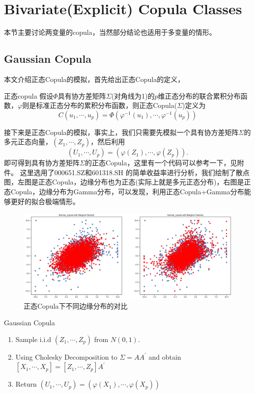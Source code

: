 \documentclass[12pt]{article}
\begin{document}






\section{Bivariate(Explicit) Copula Classes}
本节主要讨论两变量的copula，当然部分结论也适用于多变量的情形。
\subsection{Gaussian Copula}
本文介绍正态Copula的模拟，首先给出正态Copula的定义，
\begin{sdefinition}{正态copula}{}
假设$\Phi$具有协方差矩阵$\Sigma$(对角线为1)的$p$维正态分布的联合累积分布函数，$\varphi$则是标准正态分布的累积分布函数，则正态Copula($\Sigma$)定义为
$$
C(u_1,\cdots,u_p) = \Phi(\varphi^{-1}(u_1),\cdots,\varphi^{-1}(u_p))
$$
\end{sdefinition}

接下来是正态Copula的模拟，事实上，我们只需要先模拟一个具有协方差矩阵$\Sigma$的多元正态向量，$(Z_1,\cdots,Z_p)$，然后利用
$$
(U_1,\cdots,U_p) = (\varphi(Z_1),\cdots,\varphi(Z_p)).
$$
即可得到具有协方差矩阵$\Sigma$的正态Copula，这里有一个代码可以参考一下，见附件。
这里选用了000651.SZ和601318.SH	的简单收益率进行分析，我们绘制了散点图，左图是正态Copula，边缘分布也为正态(实际上就是多元正态分布)，右图是正态Copula，边缘分布为Gamma分布，可以发现，利用正态Copula+Gamma分布能够更好的拟合极端情形。

\begin{figure}[htb]
	\centering
	\includegraphics[scale=0.4]{figure/Copula_contrast.png}
	\caption{正态Copula下不同边缘分布的对比}
\end{figure}

\begin{algorithm}{Gaussian Copula}{}
\begin{enumerate}
	\item Sample i.i.d $(Z_1,\cdots,Z_p)$ from $N(0,1)$.
	\item Using Cholesky Decomposition to $\Sigma=A A^\prime$ and obtain $[X_1,\cdots,X_p]=[Z_1,\cdots,Z_p]A^\prime$
	\item Return $(U_1,\cdots,U_p) = (\varphi(X_1),\cdots,\varphi(X_p))$
\end{enumerate}
\end{algorithm}
\end{document}
